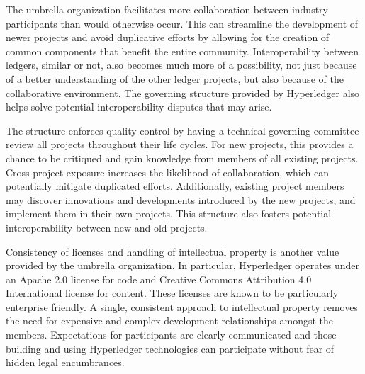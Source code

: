 The umbrella organization facilitates more collaboration between industry participants than would otherwise occur.  This can streamline the development of newer projects and avoid duplicative efforts by allowing for the creation of common components that benefit the entire community. Interoperability between ledgers, similar or not, also becomes much more of a possibility, not just because of a better understanding of the other ledger projects, but also because of the  collaborative environment. The governing structure provided by Hyperledger also helps solve potential interoperability disputes that may arise. 

The structure enforces quality control by having a technical governing committee review all projects throughout their life cycles.  For new projects, this provides a chance to be critiqued and gain knowledge from members of all existing projects. Cross-project exposure increases the likelihood of collaboration, which can potentially mitigate duplicated efforts. Additionally, existing project members may discover innovations and developments introduced by the new projects, and implement them in their own projects. This structure also fosters potential interoperability between new and old projects.

Consistency of licenses and handling of intellectual property is another value provided by the umbrella organization. In particular, Hyperledger operates under an Apache 2.0 license for code and Creative Commons Attribution 4.0 International license for content. These licenses are known to be particularly enterprise friendly. A single, consistent approach to intellectual property removes the need for expensive and complex development relationships amongst the members. Expectations for participants are clearly communicated and those building and using Hyperledger technologies can participate without fear of hidden legal encumbrances.
